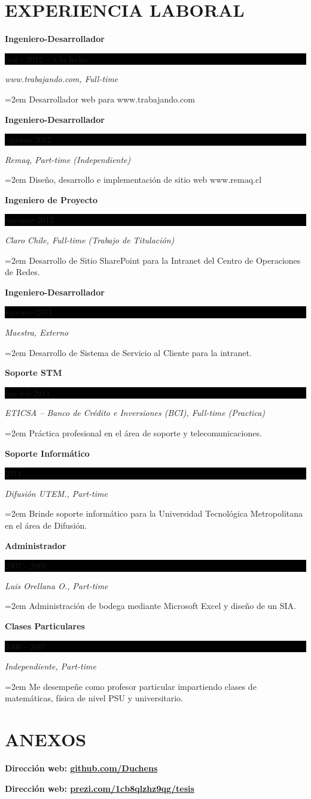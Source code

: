 \documentclass[paper=a4,fontsize=11pt]{scrartcl}	 			%
\newcommand{\sepspace}{\vspace*{1em}}			%
\newcommand{\NewPart}[1]{\section*{\uppercase{#1}}}
\newcommand{\EducationEntry}[4]{
		\noindent \textbf{#1} \hfill 					%
		\colorbox{Black}{%
			\parbox{6em}{%
			\hfill\color{White}#2}} \par				%
		\noindent \textit{#3} \par					%
		\noindent\hangindent=2em\hangafter=0 \small #4 	%
		\normalsize \par}
\begin{document}
 
\NewPart{Experiencia Laboral}{}

\EducationEntry{Ingeniero-Desarrollador}{Sep - 2012 -- a la fecha}{www.trabajando.com,  Full-time}{Desarrollador web para  www.trabajando.com}

\sepspace

\EducationEntry{Ingeniero-Desarrollador}{ago-sep-2012}{Remaq,  Part-time (Independiente)}{Diseño, desarrollo e implementación de sitio web www.remaq.cl}

\sepspace

\EducationEntry{Ingeniero de Proyecto}{ene-mar-2012}{Claro Chile,  Full-time (Trabajo de Titulación)}{Desarrollo de Sitio SharePoint para la Intranet del Centro de Operaciones de Redes.}

\sepspace

\EducationEntry{Ingeniero-Desarrollador}{ago-nov-2011}{Maestra, Externo}{Desarrollo de Sistema de Servicio al Cliente para la intranet.}

\sepspace

\EducationEntry{Soporte STM}{ene-feb-2011}{ETICSA – Banco de Crédito e Inversiones (BCI), Full-time (Practica)}{Práctica profesional en el área de soporte y telecomunicaciones.}

 
\sepspace

\EducationEntry{Soporte Informático}{2011}{Difusión UTEM., Part-time}{Brinde soporte informático para la Universidad Tecnológica Metropolitana en el área de Difusión.}

\sepspace

\EducationEntry{Administrador}{2007 - 2008}{Luis Orellana O., Part-time}{Administración de bodega mediante Microsoft Excel y diseño de un SIA.}

\sepspace

\EducationEntry{Clases Particulares}{2006 - 2007}{Independiente, Part-time}{Me desempeñe como profesor particular impartiendo  clases de matemáticas, física de nivel PSU y universitario. }


\NewPart{Anexos}{}
\textbf{Dirección web: \hspace{0.6cm}   \url{github.com/Duchens}}

\sepspace

\textbf{Dirección web:  \hspace{0.6cm}  \url{prezi.com/1cb8qlzhz9qg/tesis}}
\end{document}
